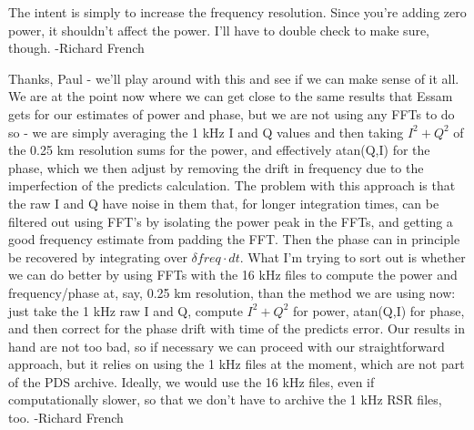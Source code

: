 \documentclass[crop=false,class=book]{standalone}
\begin{document}
        The intent is simply to increase the frequency resolution.  Since you’re adding zero power, it shouldn’t affect the power.  I’ll have to double check to make sure, though. -Richard French\par
        Thanks, Paul - we'll play around with this and see if we can make sense of it all. We are at the point now where we can get close to the same results that Essam gets for our estimates of power and phase, but we are not using any FFTs to do so - we are simply averaging the 1 kHz I and Q values and then taking $I^{2} + Q^{2}$ of the 0.25 km resolution sums for the power, and effectively atan(Q,I) for the phase, which we then adjust by removing the drift in frequency due to the imperfection of the predicts calculation. The problem with this approach is that the raw I and Q have noise in them that, for longer integration times, can be filtered out using FFT's by isolating the power peak in the FFTs, and getting a good frequency estimate from padding the FFT. Then the phase can in principle be recovered by integrating over $\delta freq\cdot dt$. What I'm trying to sort out is whether we can do better by using FFTs with the 16 kHz files to compute the power and frequency/phase at, say, 0.25 km resolution, than the method we are using now: just take the 1 kHz raw I and Q, compute $I^{2} + Q^{2}$ for power, atan(Q,I) for phase, and then correct for the phase drift with time of the predicts error. Our results in hand are not too bad, so if necessary we can proceed with our straightforward approach, but it relies on using the 1 kHz files at the moment, which are not part of the PDS archive. Ideally, we would use the 16 kHz files, even if computationally slower, so that we don't have to archive the 1 kHz RSR files, too. -Richard French
\end{document}
